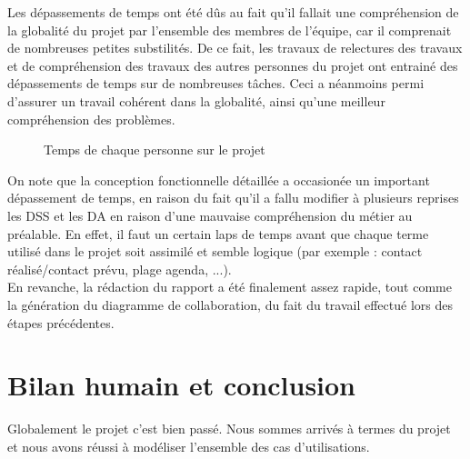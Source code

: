 Les dépassements de temps ont été dûs au fait qu'il fallait une compréhension de la globalité du projet par l'ensemble des membres de l'équipe, car il comprenait de nombreuses petites substilités. De ce fait, les travaux de relectures des travaux et de compréhension des travaux des autres personnes du projet ont entrainé des dépassements de temps sur de nombreuses tâches. Ceci a néanmoins permi d'assurer un travail cohérent dans la globalité, ainsi qu'une meilleur compréhension des problèmes.\\



\begin{figure}[H]
\noindent{}
\caption{Temps de chaque personne sur le projet}
\end{figure}


On note que la conception fonctionnelle détaillée a occasionée un important dépassement de temps, en raison du fait qu'il a fallu modifier à plusieurs reprises les DSS et les DA en raison d'une mauvaise compréhension du métier au préalable. En effet, il faut un certain laps de temps avant que chaque terme utilisé dans le projet soit assimilé et semble logique (par exemple : contact réalisé/contact prévu, plage agenda, ...).\\

En revanche, la rédaction du rapport a été finalement assez rapide, tout comme la génération du diagramme de collaboration, du fait du travail effectué lors des étapes précédentes.

\section*{Bilan humain et conclusion}
Globalement le projet c’est bien passé. Nous sommes arrivés à termes du projet et nous avons réussi à modéliser l'ensemble des cas d'utilisations.\\

